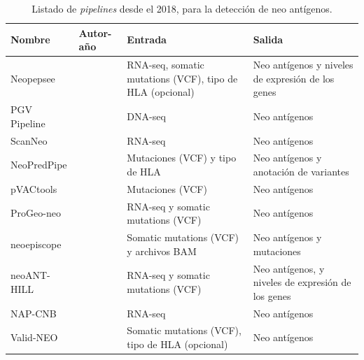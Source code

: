 \begin{table}[H]
	\caption{Listado de \textit{pipelines} desde el 2018, para la detección de neo antígenos.}
	\label{tab:review_pipelines}
	\begin{tabular}{lp{2.5cm}p{4cm}p{4cm}}
		\textbf{Nombre} & \textbf{Autor-año}                                  & \textbf{Entrada}                                         & \textbf{Salida}                                     \\ \hline
		Neopepsee       & \cite{kim2018neopepsee}           & RNA-seq, somatic mutations (VCF), tipo de HLA (opcional) & Neo antígenos y niveles de expresión de los genes   \\
		PGV Pipeline    & \cite{rubinsteyn2018computational}& DNA-seq                                                  & Neo antígenos                                       \\
		ScanNeo         & \cite{wang2019scanneo}            & RNA-seq                                                  & Neo antígenos                                       \\
		NeoPredPipe     & \cite{schenck2019neopredpipe}     & Mutaciones (VCF) y tipo de HLA                           & Neo antígenos y anotación de variantes              \\
		pVACtools       & \cite{hundal2020pvactools}        & Mutaciones (VCF)                                         & Neo antígenos                                       \\
		ProGeo-neo      & \cite{li2020progeo}               & RNA-seq y somatic mutations (VCF)                        & Neo antígenos                                       \\
		neoepiscope     & \cite{wood2020neoepiscope}        & Somatic mutations (VCF) y archivos BAM                   & Neo antígenos y mutaciones                          \\
		neoANT-HILL     & \cite{coelho2020neoant}           & RNA-seq y somatic mutations (VCF)                        & Neo antígenos,  y niveles de expresión de los genes \\
		NAP-CNB         & \cite{wert2021predicting}         & RNA-seq                                                  & Neo antígenos                                       \\
		Valid-NEO       & \cite{terai2022valid}             & Somatic mutations (VCF), tipo de HLA (opcional)          & Neo antígenos                                      
	\end{tabular}
\end{table}


